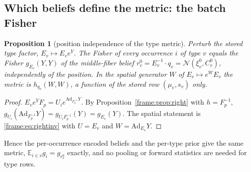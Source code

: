 \documentclass[11pt]{article}
\newtheorem{proposition}[theorem]{Proposition}
\theoremstyle{definition}
\theoremstyle{remark}
\providecommand{\Ad}{\mathrm{Ad}}
\providecommand{\Normal}{\mathcal{N}}
\begin{document}
\subsection{Which beliefs define the metric: the batch Fisher}\label{frame:sec:batch}

\begin{proposition}[position independence of the type metric]\label{frame:prop:position}
Perturb the stored type factor, $E_v\mapsto E_ve^{Y}$. The Fisher of every occurrence $i$ of type $v$ equals the Fisher $g_{E_v}(Y,Y)$ of the middle-fiber belief $r_v^0=E_v^{-1}\cdot q_v=\Normal(\xi^0_v,C^0_v)$, independently of the position. In the spatial generator $W$ of $E_v\mapsto e^{W}E_v$ the metric is $h_{q_v}(W,W)$, a function of the stored row $(\mu_v,s_v)$ only.
\end{proposition}
\begin{proof}
$E_ve^YF_p=U_ie^{\Ad_{F_p^{-1}}Y}$. By Proposition~\ref{frame:prop:right} with $h=F_p^{-1}$, $g_{U_i}(\Ad_{F_p^{-1}}Y)=g_{U_iF_p^{-1}}(Y)=g_{E_v}(Y)$. The spatial statement is \eqref{frame:eq:rightinv} with $U=E_v$ and $W=\Ad_{E_v}Y$.
\end{proof}

Hence the per-occurrence encoded beliefs and the per-type prior give the same metric, $\mathbb{E}_{i\in v}g_i=g_{r^0_v}$ exactly, and no pooling or forward statistics are needed for type rows.
\end{document}
